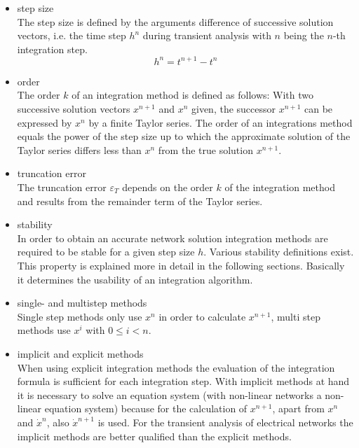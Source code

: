 \begin{itemize}
\item step size\\
The step size is defined by the arguments difference of successive
solution vectors, i.e. the time step $h^n$ during transient analysis
with $n$ being the $n$-th integration step.
\begin{equation}
h^n = t^{n+1} - t ^n
\end{equation}

\item order\\
The order $k$ of an integration method is defined as follows: With two
successive solution vectors $x^{n+1}$ and $x^{n}$ given, the successor
$x^{n+1}$ can be expressed by $x^{n}$ by a finite Taylor series.  The
order of an integrations method equals the power of the step size up
to which the approximate solution of the Taylor series differs less
than $x^{n}$ from the true solution $x^{n+1}$.

\item truncation error\\
The truncation error $\varepsilon_T$ depends on the order $k$ of the
integration method and results from the remainder term of the Taylor
series.

\item stability\\
In order to obtain an accurate network solution integration methods
are required to be stable for a given step size $h$.  Various
stability definitions exist.  This property is explained more in
detail in the following sections.  Basically it determines the
usability of an integration algorithm.

\item single- and multistep methods\\
Single step methods only use $x^n$ in order to calculate $x^{n+1}$,
multi step methods use $x^i$ with $0 \le i < n$.

\item implicit and explicit methods\\
When using explicit integration methods the evaluation of the
integration formula is sufficient for each integration step.  With
implicit methods at hand it is necessary to solve an equation system
(with non-linear networks a non-linear equation system) because for
the calculation of $x^{n+1}$, apart from $x^n$ and $\dot{x}^n$, also
$\dot{x}^{n+1}$ is used.  For the transient analysis of electrical
networks the implicit methods are better qualified than the explicit
methods.
\end{itemize}

